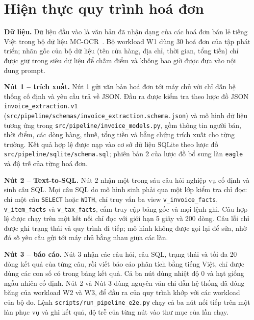 \section{Hiện thực quy trình hoá đơn}
\label{sec:ht-pipeline}

\textbf{Dữ liệu.} Dữ liệu đầu vào là văn bản đã nhận dạng của các hoá đơn bán lẻ tiếng Việt trong bộ dữ liệu MC-OCR~\cite{vu2021mcocr}. Bộ workload W1 dùng 30 hoá đơn của tập phát triển; nhãn gốc của bộ dữ liệu (tên cửa hàng, địa chỉ, thời gian, tổng tiền) chỉ được giữ trong siêu dữ liệu để chấm điểm và không bao giờ được đưa vào nội dung prompt.

\textbf{Nút 1 -- trích xuất.} Nút 1 gửi văn bản hoá đơn tới máy chủ với chỉ dẫn hệ thống cố định và yêu cầu trả về JSON. Đầu ra được kiểm tra theo lược đồ JSON \texttt{invoice\_extraction.v1} (\texttt{src/pipeline/schemas/invoice\_extraction.schema.json}) và mô hình dữ liệu tương ứng trong \texttt{src/pipeline/invoice\_models.py}, gồm thông tin người bán, thời điểm, các dòng hàng, thuế, tổng tiền và bằng chứng trích xuất cho từng trường. Kết quả hợp lệ được nạp vào cơ sở dữ liệu SQLite theo lược đồ \texttt{src/pipeline/sqlite/schema.sql}; phiên bản 2 của lược đồ bổ sung làn \texttt{eagle} và độ trễ của từng hoá đơn.

\textbf{Nút 2 -- Text-to-SQL.} Nút 2 nhận một trong sáu câu hỏi nghiệp vụ cố định và sinh câu SQL. Mọi câu SQL do mô hình sinh phải qua một lớp kiểm tra chỉ đọc: chỉ một câu \texttt{SELECT} hoặc \texttt{WITH}, chỉ truy vấn ba view \texttt{v\_invoice\_facts}, \texttt{v\_item\_facts} và \texttt{v\_tax\_facts}, cấm truy cập bảng gốc và mọi lệnh ghi. Câu hợp lệ được chạy trên một kết nối chỉ đọc với giới hạn 5 giây và 200 dòng. Câu lỗi chỉ được ghi trạng thái và quy trình đi tiếp; mô hình không được gọi lại để sửa, nhờ đó số yêu cầu gửi tới máy chủ bằng nhau giữa các làn.

\textbf{Nút 3 -- báo cáo.} Nút 3 nhận các câu hỏi, câu SQL, trạng thái và tối đa 20 dòng kết quả của từng câu, rồi viết báo cáo phân tích bằng tiếng Việt, chỉ được dùng các con số có trong bảng kết quả. Cả ba nút dùng nhiệt độ 0 và hạt giống ngẫu nhiên cố định. Nút 2 và Nút 3 dùng nguyên văn chỉ dẫn hệ thống đã đóng băng của workload W2 và W3, để đầu ra của quy trình khớp với các workload của bộ đo. Lệnh \texttt{scripts/run\_pipeline\_e2e.py} chạy cả ba nút nối tiếp trên một làn phục vụ và ghi kết quả, độ trễ của từng nút vào thư mục của lần chạy.

